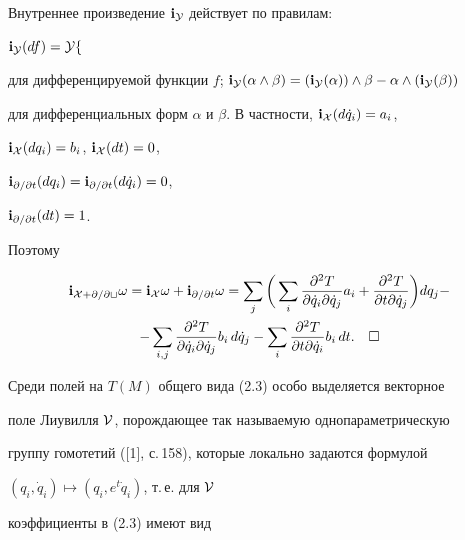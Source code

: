 Внутреннее произведение $\bold i_{\cal Y}$ действует по правилам:


$\bold i_{\cal 


Y}(df)=\cal Y f$ 


для дифференцируемой функции $f$; $\bold i_{\cal Y}(\alpha\wedge\beta)= 


(\bold i_{\cal Y}(\alpha))\wedge\beta-\alpha\wedge(\bold i_{\cal Y}(\beta))$ 


для дифференциальных форм $\alpha$ и $\beta$. В частности, $\bold i_{\cal 


X}(d\Dot q_i)=a_i$, 


$\bold i_{\cal X}(dq_i)=b_i$, $\bold i_{\cal X}(dt)=0$, 


$\bold i_{\partial/\partial t}(dq_i)=\bold


i_{\partial/\partial t}(d\Dot q_i)=0$, 


$\bold i_{\partial/\partial t}(dt)=1$. 


Поэтому 


\begin{multline} 


\bold i_{\cal X+\partial/\partial t}\omega=\bold i_{\cal X}\omega+ 


\bold i_{\partial/\partial t}\omega=\sum_j\bigg(\sum_i 


\frac{\partial^2T}{\partial\Dot q_i\partial\Dot q_j}a_i+ 


\frac{\partial^2T}{\partial t\partial\Dot q_j}\bigg)dq_j- \\ 


% 


-\sum_{i,j}\frac{\partial^2T}{\partial\Dot q_i\partial\Dot q_j} 


b_i\,d\Dot q_j-\sum_i 


\frac{\partial^2T}{\partial t\partial\Dot q_i}b_i\,dt.\quad\square 


\end{multline} 


 


Среди полей на $T(M)$ общего вида (2.3) особо выделяется векторное 


поле Лиувилля $\cal V$, порождающее так называемую однопараметрическую 


группу гомотетий ([1], с.\,158), которые локально задаются формулой 


$(q_i,\Dot q_i)\mapsto(q_i,e^t\Dot q_i)$, т.\,е. для $\cal V$ 


коэффициенты в (2.3) имеют вид 


